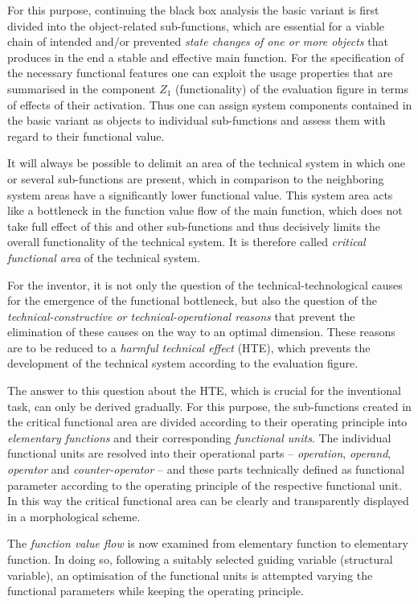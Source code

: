 \documentclass[11pt,a4paper]{article}
\begin{document}
For this purpose, continuing the black box analysis the basic variant is first
divided into the object-related sub-functions, which are essential for a
viable chain of intended and/or prevented \emph{state changes of one or more
  objects} that produces in the end a stable and effective main function.  For
the specification of the necessary functional features one can exploit the
usage properties that are summarised in the component $Z_1$ (functionality) of
the evaluation figure in terms of effects of their activation. Thus one can
assign system components contained in the basic variant as objects to
individual sub-functions and assess them with regard to their functional
value.

It will always be possible to delimit an area of the technical system in which
one or several sub-functions are present, which in comparison to the
neighboring system areas have a significantly lower functional value. This
system area acts like a bottleneck in the function value flow of the main
function, which does not take full effect of this and other sub-functions and
thus decisively limits the overall functionality of the technical system. It
is therefore called \emph{critical functional area} of the technical system.

For the inventor, it is not only the question of the technical-technological
causes for the emergence of the functional bottleneck, but also the question
of the \emph{technical-constructive or technical-operational reasons} that
prevent the elimination of these causes on the way to an optimal dimension.
These reasons are to be reduced to a \emph{harmful technical effect} (HTE),
which prevents the development of the technical system according to the
evaluation figure.

The answer to this question about the HTE, which is crucial for the
inventional task, can only be derived gradually. For this purpose, the
sub-functions created in the critical functional area are divided according to
their operating principle into \emph{elementary functions} and their
corresponding \emph{functional units}. The individual functional units are
resolved into their operational parts -- \emph{operation}, \emph{operand},
\emph{operator} and \emph{counter-operator} -- and these parts technically
defined as functional parameter according to the operating principle of the
respective functional unit. In this way the critical functional area can be
clearly and transparently displayed in a morphological scheme.

The \emph{function value flow} is now examined from elementary function to
elementary function.  In doing so, following a suitably selected guiding
variable (structural variable), an optimisation of the functional units is
attempted varying the functional parameters while keeping the operating
principle.
\end{document}
